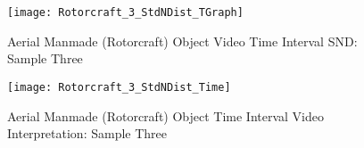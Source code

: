 \newpage  %


\begin{figure}[H]
	\center 
	\texttt{[image: Rotorcraft\_3\_StdNDist\_TGraph]}
	\captionsetup{list=no}	
	\caption[Aerial Manmade (Rotorcraft) Object Video Time Interval SND: Sample Three]{Aerial Manmade (Rotorcraft) Object Video Time Interval SND: Sample Three}
\end{figure}

\begin{figure}[H]
	\center 
	\texttt{[image: Rotorcraft\_3\_StdNDist\_Time]}
	\captionsetup{list=no}	
	\caption[Aerial Manmade (Rotorcraft) Object Time Interval Video Interpretation: Sample Three]{Aerial Manmade (Rotorcraft) Object Time Interval Video Interpretation: Sample Three}
\end{figure}
